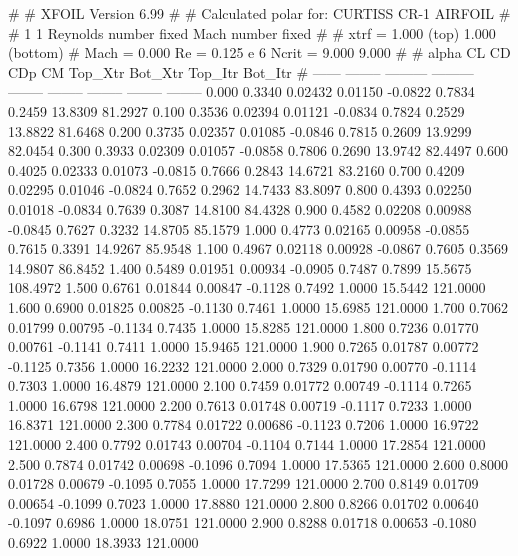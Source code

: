 #  
#       XFOIL         Version 6.99
#  
# Calculated polar for: CURTISS CR-1 AIRFOIL                            
#  
# 1 1 Reynolds number fixed          Mach number fixed         
#  
# xtrf =   1.000 (top)        1.000 (bottom)  
# Mach =   0.000     Re =     0.125 e 6     Ncrit =   9.000  9.000
#  
#   alpha    CL        CD       CDp       CM     Top_Xtr  Bot_Xtr  Top_Itr  Bot_Itr
#  ------ -------- --------- --------- -------- -------- -------- -------- --------
   0.000   0.3340   0.02432   0.01150  -0.0822   0.7834   0.2459  13.8309  81.2927
   0.100   0.3536   0.02394   0.01121  -0.0834   0.7824   0.2529  13.8822  81.6468
   0.200   0.3735   0.02357   0.01085  -0.0846   0.7815   0.2609  13.9299  82.0454
   0.300   0.3933   0.02309   0.01057  -0.0858   0.7806   0.2690  13.9742  82.4497
   0.600   0.4025   0.02333   0.01073  -0.0815   0.7666   0.2843  14.6721  83.2160
   0.700   0.4209   0.02295   0.01046  -0.0824   0.7652   0.2962  14.7433  83.8097
   0.800   0.4393   0.02250   0.01018  -0.0834   0.7639   0.3087  14.8100  84.4328
   0.900   0.4582   0.02208   0.00988  -0.0845   0.7627   0.3232  14.8705  85.1579
   1.000   0.4773   0.02165   0.00958  -0.0855   0.7615   0.3391  14.9267  85.9548
   1.100   0.4967   0.02118   0.00928  -0.0867   0.7605   0.3569  14.9807  86.8452
   1.400   0.5489   0.01951   0.00934  -0.0905   0.7487   0.7899  15.5675 108.4972
   1.500   0.6761   0.01844   0.00847  -0.1128   0.7492   1.0000  15.5442 121.0000
   1.600   0.6900   0.01825   0.00825  -0.1130   0.7461   1.0000  15.6985 121.0000
   1.700   0.7062   0.01799   0.00795  -0.1134   0.7435   1.0000  15.8285 121.0000
   1.800   0.7236   0.01770   0.00761  -0.1141   0.7411   1.0000  15.9465 121.0000
   1.900   0.7265   0.01787   0.00772  -0.1125   0.7356   1.0000  16.2232 121.0000
   2.000   0.7329   0.01790   0.00770  -0.1114   0.7303   1.0000  16.4879 121.0000
   2.100   0.7459   0.01772   0.00749  -0.1114   0.7265   1.0000  16.6798 121.0000
   2.200   0.7613   0.01748   0.00719  -0.1117   0.7233   1.0000  16.8371 121.0000
   2.300   0.7784   0.01722   0.00686  -0.1123   0.7206   1.0000  16.9722 121.0000
   2.400   0.7792   0.01743   0.00704  -0.1104   0.7144   1.0000  17.2854 121.0000
   2.500   0.7874   0.01742   0.00698  -0.1096   0.7094   1.0000  17.5365 121.0000
   2.600   0.8000   0.01728   0.00679  -0.1095   0.7055   1.0000  17.7299 121.0000
   2.700   0.8149   0.01709   0.00654  -0.1099   0.7023   1.0000  17.8880 121.0000
   2.800   0.8266   0.01702   0.00640  -0.1097   0.6986   1.0000  18.0751 121.0000
   2.900   0.8288   0.01718   0.00653  -0.1080   0.6922   1.0000  18.3933 121.0000
